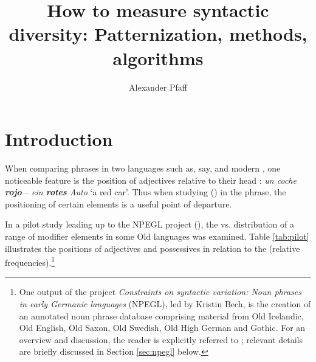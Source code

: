 \documentclass[output=paper,colorlinks,citecolor=brown,draft]{langscibook}
\author{Alexander Pfaff\orcid{}\affiliation{University of Stuttgart}}
\title[How to measure syntactic diversity: Patternization]{How to measure syntactic diversity:  Patternization, methods, algorithms}
\begin{document}
\maketitle

\section{Introduction}

When comparing  phrases in two languages such as, say,  and modern , one noticeable feature is the position of adjectives relative to their head : \textit{un coche \textbf{rojo}} --  \textit{ein \textbf{rotes} Auto}  `a red car'. Thus when studying ()  in the  phrase, the positioning of certain elements is a useful point of departure.

In a pilot study leading up to the NPEGL project (), the  vs.  distribution of a range of modifier elements in some Old  languages was examined. Table \ref{tab:pilot} illustrates the positions of adjectives and possessives in relation to the  (relative frequencies).\footnote{One output of the project \textit{Constraints on syntactic variation: Noun phrases in early Germanic languages} (NPEGL), led by Kristin Bech, is the creation of an annotated noun phrase database  comprising material from Old Icelandic, Old English, Old Saxon, Old Swedish, Old High German and Gothic. For an overview and discussion, the reader is explicitly referred to ; relevant details are briefly discussed in Section \ref{sec:npegl} below.}
\end{document}
